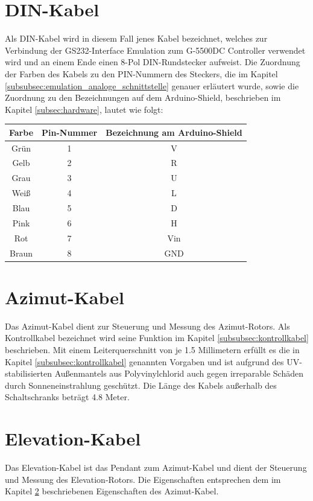 \section{DIN-Kabel}
\label{sec:DIN-Kabel}
Als DIN-Kabel wird in diesem Fall jenes Kabel bezeichnet, welches zur Verbindung der GS232-Interface Emulation zum G-5500DC Controller verwendet wird und an einem Ende einen 8-Pol DIN-Rundstecker aufweist. Die Zuordnung der Farben des Kabels zu den PIN-Nummern des Steckers, die im Kapitel \ref{subsubsec:emulation_analoge_schnittstelle} genauer erläutert wurde, sowie die Zuordnung zu den Bezeichnungen auf dem Arduino-Shield, beschrieben im Kapitel \ref{subsec:hardware}, lautet wie folgt:

\begin{table}
	\centering
	\begin{tabular}{c|c|c}
		\textbf{Farbe} & \textbf{Pin-Nummer} & \textbf{Bezeichnung am Arduino-Shield} \\
		\hline
		Grün & 1 & V \\
		Gelb & 2 & R \\
		Grau & 3 & U \\
		Weiß & 4 & L \\
		Blau & 5 & D \\
		Pink & 6 & H \\
		Rot & 7 & Vin \\
		Braun & 8 & GND \\
	\end{tabular}
\end{table}

\section{Azimut-Kabel}
\label{sec:azimutkabel}
Das Azimut-Kabel dient zur Steuerung und Messung des Azimut-Rotors. Als Kontrollkabel bezeichnet wird seine Funktion im Kapitel \ref{subsubsec:kontrollkabel} beschrieben. Mit einem Leiterquerschnitt von je 1.5 Millimetern erfüllt es die in Kapitel \ref{subsubsec:kontrollkabel} genannten Vorgaben und ist aufgrund des UV-stabilisierten Außenmantels aus Polyvinylchlorid auch gegen irreparable Schäden durch Sonneneinstrahlung geschützt. Die Länge des Kabels außerhalb des Schaltschranks beträgt 4.8 Meter. 

\section{Elevation-Kabel}
\label{sec:Elevation-Kabel}
Das Elevation-Kabel ist das Pendant zum Azimut-Kabel und dient der Steuerung und Messung des Elevation-Rotors. Die Eigenschaften entsprechen dem im Kapitel \ref{sec:azimutkabel} beschriebenen Eigenschaften des Azimut-Kabel.

